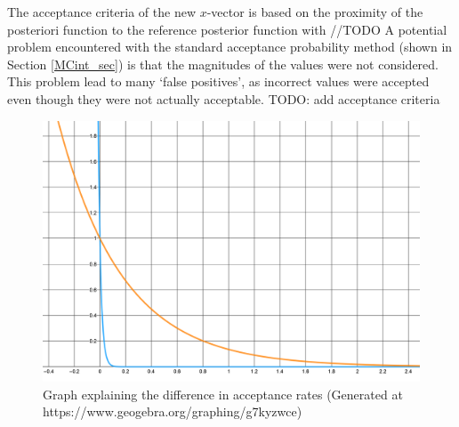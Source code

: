 	

%	
	
	The acceptance criteria of the new $x$-vector is based on the proximity of the posteriori function to the reference posterior function with //TODO
	A potential problem encountered with the standard acceptance probability method (shown in Section \ref{MCint_sec}) is that the magnitudes of the values were not considered. 
	This problem lead to many `false positives', as incorrect values were accepted even though they were not actually acceptable. TODO: add acceptance criteria
	
	\begin{figure}[H]
	\centering
	\includegraphics[width = 0.5\linewidth]{figures/e_expl_curve.png}
	\caption{Graph explaining the difference in acceptance rates (Generated at https://www.geogebra.org/graphing/g7kyzwce)}
	\end{figure}
	 
	
	
